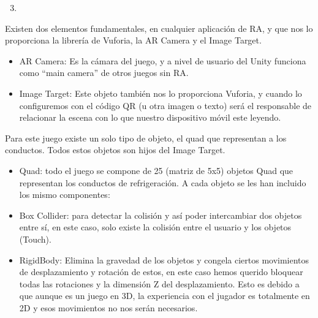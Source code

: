 \documentclass[]{article}
\begin{document}
\begin{enumerate}
\setcounter{enumi}{2}
\item
\end{enumerate}


Existen dos elementos fundamentales, en cualquier aplicación de RA, y
que nos lo proporciona la librería de Vuforia, la AR Camera y el Image
Target.

\begin{itemize}
\itemsep1pt\parskip0pt
\item
  AR Camera: Es la cámara del juego, y a nivel de usuario del Unity
  funciona como ``main camera'' de otros juegos sin RA.
\item
  Image Target: Este objeto también nos lo proporciona Vuforia, y cuando
  lo configuremos con el código QR (u otra imagen o texto) será el
  responsable de relacionar la escena con lo que nuestro dispositivo
  móvil este leyendo.
\end{itemize}

Para este juego existe un solo tipo de objeto, el quad que representan a
los conductos. Todos estos objetos son hijos del Image Target.

\begin{itemize}
\itemsep1pt\parskip0pt
\item
  Quad: todo el juego se compone de 25 (matriz de 5x5) objetos Quad que
  representan los conductos de refrigeración. A cada objeto se les han
  incluido los mismo componentes:
\end{itemize}

\begin{itemize}
\itemsep1pt\parskip0pt
\item
  Box Collider: para detectar la colisión y así poder intercambiar dos
  objetos entre sí, en este caso, solo existe la colisión entre el
  usuario y los objetos (Touch).
\item
  RigidBody: Elimina la gravedad de los objetos y congela ciertos
  movimientos de desplazamiento y rotación de estos, en este caso hemos
  querido bloquear todas las rotaciones y la dimensión Z del
  desplazamiento. Esto es debido a que aunque es un juego en 3D, la
  experiencia con el jugador es totalmente en 2D y esos movimientos no
  nos serán necesarios.
\end{itemize}
\end{document}

